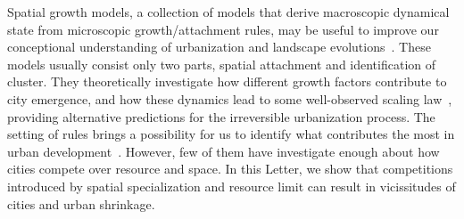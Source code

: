 \documentclass[reprint,unsortedaddress,amsmath,amssymb,aps,prl,showkeys]{revtex4-2}
\begin{document}
Spatial growth models, a collection of models that derive macroscopic dynamical state from microscopic growth/attachment rules, may be useful to improve our conceptional understanding of urbanization and landscape evolutions~\cite{PhysRevX.4.011008, Li2017Simple, makse1995modelling, rybski2013distance, nanda2017spatial}. These models usually consist only two parts, spatial attachment and identification of cluster. They theoretically investigate how different growth factors contribute to city emergence, and how these dynamics lead to some well-observed scaling law~\cite{bettencourt2007growth,court2013origins,batty2008size,batty2019urbanscalinglaw}, providing alternative predictions for the irreversible urbanization process. The setting of rules brings a possibility for us to identify what contributes the most in urban development~\cite{batty2017urban}. However, few of them have investigate enough about how cities compete over resource and space. In this Letter, we show that competitions introduced by spatial specialization and resource limit can result in vicissitudes of cities and urban shrinkage.


\end{document}

